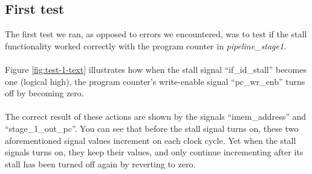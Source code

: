 \subsection{First test}

The first test we ran, as opposed to errors we encountered, was to test if the
stall functionality worked correctly with the program counter in \emph{
pipeline\_stage1}.
\paragraph*{}
Figure \ref{fig:test-1-text} illustrates how when the stall signal
``if\_id\_stall'' becomes one (logical high), the program counter's write-enable
signal ``pc\_wr\_enb'' turns off by becoming zero.
\paragraph*{}
The correct result of these actions are shown by the signals ``imem\_address''
and ``stage\_1\_out\_pc''. You can see that before the stall signal turns on,
these two aforementioned signal values increment on each clock cycle. Yet when
the stall signals turns on, they keep their values, and only continue
incrementing after its stall has been turned off again by reverting to zero.
